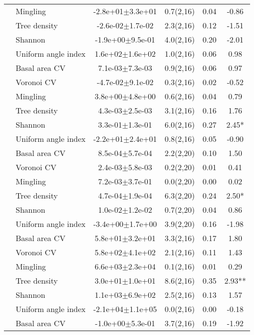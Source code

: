 \begin{table}[]
\begin{tabular}{llcccS[table-format=-2.2, table-space-text-post = {***}]}
   & Mingling & -2.8e+01$\pm$3.3e+01 & 0.7(2,16) & 0.04 & -0.86 \\ 
   & Tree density & -2.6e-02$\pm$1.7e-02 & 2.3(2,16) & 0.12 & -1.51 \\ 
   & Shannon & -1.9e+00$\pm$9.5e-01 & 4.0(2,16) & 0.20 & -2.01 \\ 
   & Uniform angle index &  1.6e+02$\pm$1.6e+02 & 1.0(2,16) & 0.06 & 0.98 \\ 
   \midrule
{} & Basal area CV &  7.1e-03$\pm$7.3e-03 & 0.9(2,16) & 0.06 & 0.97 \\ 
   & Voronoi CV & -4.7e-02$\pm$9.1e-02 & 0.3(2,16) & 0.02 & -0.52 \\ 
   & Mingling &  3.8e+00$\pm$4.8e+00 & 0.6(2,16) & 0.04 & 0.79 \\ 
   & Tree density &  4.3e-03$\pm$2.5e-03 & 3.1(2,16) & 0.16 & 1.76 \\ 
   & Shannon &  3.3e-01$\pm$1.3e-01 & 6.0(2,16) & 0.27 & 2.45* \\ 
   & Uniform angle index & -2.2e+01$\pm$2.4e+01 & 0.8(2,16) & 0.05 & -0.90 \\ 
   \midrule
{} & Basal area CV &  8.5e-04$\pm$5.7e-04 & 2.2(2,20) & 0.10 & 1.50 \\ 
   & Voronoi CV &  2.4e-03$\pm$5.8e-03 & 0.2(2,20) & 0.01 & 0.41 \\ 
   & Mingling &  7.2e-03$\pm$3.7e-01 & 0.0(2,20) & 0.00 & 0.02 \\ 
   & Tree density &  4.7e-04$\pm$1.9e-04 & 6.3(2,20) & 0.24 & 2.50* \\ 
   & Shannon &  1.0e-02$\pm$1.2e-02 & 0.7(2,20) & 0.04 & 0.86 \\ 
   & Uniform angle index & -3.4e+00$\pm$1.7e+00 & 3.9(2,20) & 0.16 & -1.98 \\ 
   \midrule
{} & Basal area CV &  5.8e+01$\pm$3.2e+01 & 3.3(2,16) & 0.17 & 1.80 \\ 
   & Voronoi CV &  5.8e+02$\pm$4.1e+02 & 2.1(2,16) & 0.11 & 1.43 \\ 
   & Mingling &  6.6e+03$\pm$2.3e+04 & 0.1(2,16) & 0.01 & 0.29 \\ 
   & Tree density &  3.0e+01$\pm$1.0e+01 & 8.6(2,16) & 0.35 & 2.93** \\ 
   & Shannon &  1.1e+03$\pm$6.9e+02 & 2.5(2,16) & 0.13 & 1.57 \\ 
   & Uniform angle index & -2.1e+04$\pm$1.1e+05 & 0.0(2,16) & 0.00 & -0.18 \\ 
   \midrule
{} & Basal area CV & -1.0e+00$\pm$5.3e-01 & 3.7(2,16) & 0.19 & -1.92 \\ 

\end{tabular}
\end{table}
